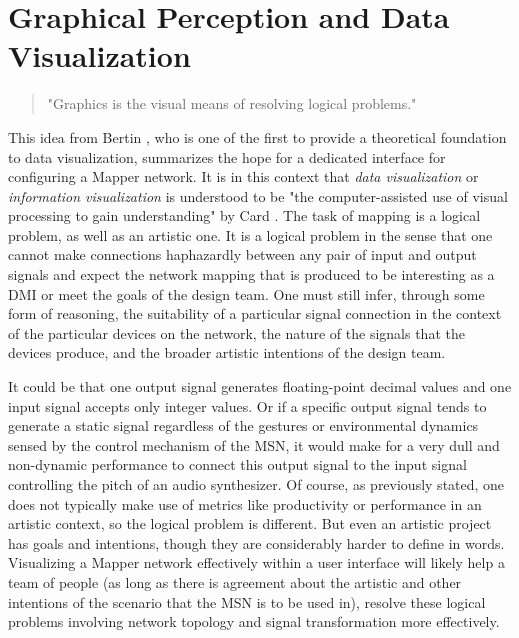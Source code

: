 \section{Graphical Perception and Data Visualization}
\label{sec:Graphical Perception}

\begin{quote}
"Graphics is the visual means of resolving logical problems."
\end{quote}

This idea from Bertin \cite{semiology1983}, who is one of the first to provide a theoretical foundation to data visualization, summarizes the hope for a dedicated interface for configuring a Mapper network. It is in this context that \emph{data visualization} or \emph{information visualization} is understood to be "the computer-assisted use of visual processing to gain understanding" by Card \cite{card1997}. 
The task of mapping is a logical problem, as well as an artistic one. It is a logical problem in the sense that one cannot make connections haphazardly between any pair of input and output signals and expect the network mapping that is produced to be interesting as a DMI or meet the goals of the design team. One must still infer, through some form of reasoning, the suitability of a particular signal connection in the context of the particular devices on the network, the nature of the signals that the devices produce, and the broader artistic intentions of the design team. 

It could be that one output signal generates floating-point decimal values and one input signal accepts only integer values. Or if a specific output signal tends to generate a static signal regardless of the gestures or environmental dynamics sensed by the control mechanism of the MSN, it would make for a very dull and non-dynamic performance to connect this output signal to the input signal controlling the pitch of an audio synthesizer. Of course, as previously stated, one does not typically make use of metrics like productivity or performance in an artistic context, so the logical problem is different. But even an artistic project has goals and intentions, though they are considerably harder to define in words. Visualizing a Mapper network effectively within a user interface will likely help a team of people (as long as there is agreement about the artistic and other intentions of the scenario that the MSN is to be used in), resolve these logical problems involving network topology and signal transformation more effectively. 

